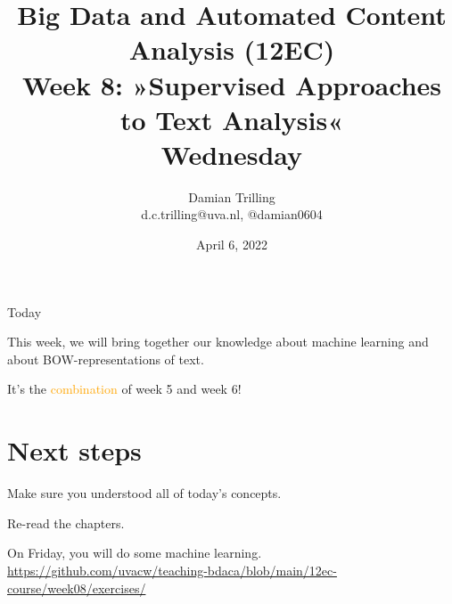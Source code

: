 

\graphicspath{{../../resources/img/}}




\title[Big Data and Automated Content Analysis]{\textbf{Big Data and Automated Content Analysis (12EC)} 
\\Week 8: »Supervised Approaches to Text Analysis«
\\Wednesday}
\author[Damian Trilling]{Damian Trilling\\ \footnotesize{d.c.trilling@uva.nl, @damian0604 \\}}
\date{April 6, 2022}


\begin{frame}{}
	\titlepage
\end{frame}

\begin{frame}{Today}
	\tableofcontents
\end{frame}




\begin{frame}[standout]
This week, we will bring together our knowledge about machine learning and about BOW-representations of text.

It's the \textcolor{orange}{combination} of week 5 and week 6!
\end{frame}














\section{Next steps}

\begin{frame}[standout]
Make sure you understood all of today's concepts.

Re-read the chapters.

On Friday, you will do some machine learning. \large{\url{https://github.com/uvacw/teaching-bdaca/blob/main/12ec-course/week08/exercises/}}
\end{frame}





\begin{frame}
	\printbibliography
\end{frame}




